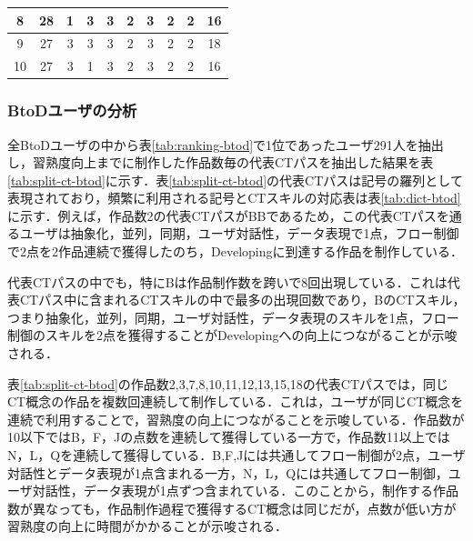 \documentclass[submit,ses,noauthor]{ipsj}
\begin{document}
\begin{table}[]
\begin{tabular}{c|c|cccccccc}
8                   & 28                   & \multicolumn{1}{c|}{1} & \multicolumn{1}{c|}{3} & \multicolumn{1}{c|}{3} & \multicolumn{1}{c|}{2} & \multicolumn{1}{c|}{3} & \multicolumn{1}{c|}{2} & \multicolumn{1}{c|}{2} & 16  \\ \hline
9                   & 27                   & \multicolumn{1}{c|}{3} & \multicolumn{1}{c|}{3} & \multicolumn{1}{c|}{3} & \multicolumn{1}{c|}{2} & \multicolumn{1}{c|}{3} & \multicolumn{1}{c|}{2} & \multicolumn{1}{c|}{2} & 18 \\ \hline
10                  & 27                   & \multicolumn{1}{c|}{3} & \multicolumn{1}{c|}{1} & \multicolumn{1}{c|}{3} & \multicolumn{1}{c|}{2} & \multicolumn{1}{c|}{3} & \multicolumn{1}{c|}{2} & \multicolumn{1}{c|}{2} & 16  \\ \hline
\end{tabular}
\end{table}

\subsubsection*{BtoDユーザの分析}

全BtoDユーザの中から表\ref{tab:ranking-btod}で1位であったユーザ291人を抽出し，習熟度向上までに制作した作品数毎の代表CTパスを抽出した結果を表\ref{tab:split-ct-btod}に示す．表\ref{tab:split-ct-btod}の代表CTパスは記号の羅列として表現されており，頻繁に利用される記号とCTスキルの対応表は表\ref{tab:dict-btod}に示す．例えば，作品数2の代表CTパスがBBであるため，この代表CTパスを通るユーザは抽象化，並列，同期，ユーザ対話性，データ表現で1点，フロー制御で2点を2作品連続で獲得したのち，Developingに到達する作品を制作している．

代表CTパスの中でも，特にBは作品制作数を跨いで8回出現している．これは代表CTパス中に含まれるCTスキルの中で最多の出現回数であり，BのCTスキル，つまり抽象化，並列，同期，ユーザ対話性，データ表現のスキルを1点，フロー制御のスキルを2点を獲得することがDevelopingへの向上につながることが示唆される．

表\ref{tab:split-ct-btod}の作品数2,3,7,8,10,11,12,13,15,18の代表CTパスでは，同じCT概念の作品を複数回連続して制作している．これは，ユーザが同じCT概念を連続で利用することで，習熟度の向上につながることを示唆している．作品数が10以下ではB，F，Jの点数を連続して獲得している一方で，作品数11以上ではN，L，Qを連続して獲得している．B,F,Jには共通してフロー制御が2点，ユーザ対話性とデータ表現が1点含まれる一方，N，L，Qには共通してフロー制御，ユーザ対話性，データ表現が1点ずつ含まれている．このことから，制作する作品数が異なっても，作品制作過程で獲得するCT概念は同じだが，点数が低い方が習熟度の向上に時間がかかることが示唆される．
\end{document}
